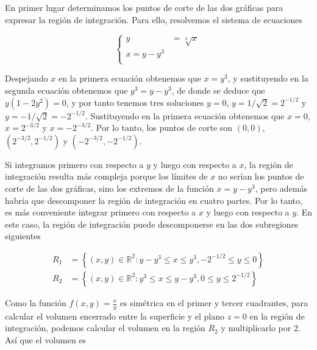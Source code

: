 \documentclass[
  a4paper,
]{scrreport}
\theoremstyle{definition}
\theoremstyle{remark}
\begin{document}
\begin{tcolorbox}[enhanced jigsaw, colback=white, toprule=.15mm, coltitle=black, left=2mm, breakable, toptitle=1mm, title=\textcolor{quarto-callout-tip-color}{\faLightbulb}\hspace{0.5em}{Solución}, opacitybacktitle=0.6, leftrule=.75mm, bottomrule=.15mm, titlerule=0mm, arc=.35mm, opacityback=0, colframe=quarto-callout-tip-color-frame, colbacktitle=quarto-callout-tip-color!10!white, bottomtitle=1mm, rightrule=.15mm]

En primer lugar determinamos los puntos de corte de las dos gráficas
para expresar la región de integración. Para ello, resolvemos el sistema
de ecuaciones

\[
\begin{cases}
y &= \sqrt[3]{x}\\
x = y-y^3 \\
\end{cases}
\]

Despejando \(x\) en la primera ecuación obtenemos que \(x=y^3\), y
sustituyendo en la segunda ecuación obtenemos que \(y^3 = y-y^3\), de
donde se deduce que \(y(1-2y^2)=0\), y por tanto tenemos tres soluciones
\(y=0\), \(y=1/\sqrt{2}=2^{-1/2}\) y \(y=-1/\sqrt{2}=-2^{-1/2}\).
Sustituyendo en la primera ecuación obtenemos que \(x=0\),
\(x=2^{-3/2}\) y \(x=-2^{-3/2}\). Por lo tanto, los puntos de corte son
\((0,0)\), \((2^{-3/2}, 2^{-1/2})\) y \((-2^{-3/2}, -2^{-1/2})\).

Si integramos primero con respecto a \(y\) y luego con respecto a \(x\),
la región de integración resulta más compleja porque los límites de
\(x\) no serían los puntos de corte de las dos gráficas, sino los
extremos de la función \(x=y-y^3\), pero además habría que descomponer
la región de integración en cuatro partes. Por lo tanto, es más
conveniente integrar primero con respecto a \(x\) y luego con respecto a
\(y\). En este caso, la región de integración puede descomponerse en las
dos subregiones siguientes

\begin{align*}
R_1 &= \left\{ (x,y) \in \mathbb{R}^2:  y-y^3 \leq x \leq y^3, -2^{-1/2} \leq y \leq 0 \right\} \\
R_2 &= \left\{ (x,y) \in \mathbb{R}^2:  y^3 \leq x \leq y-y^3, 0 \leq y \leq 2^{-1/2} \right\}
\end{align*}

Como la función \(f(x,y)=\frac{x}{y}\) es simétrica en el primer y
tercer cuadrantes, para calcular el volumen encerrado entre la
superficie y el plano \(z=0\) en la región de integración, podemos
calcular el volumen en la región \(R_2\) y multiplicarlo por 2. Así que
el volumen es


\end{tcolorbox}
\end{document}
